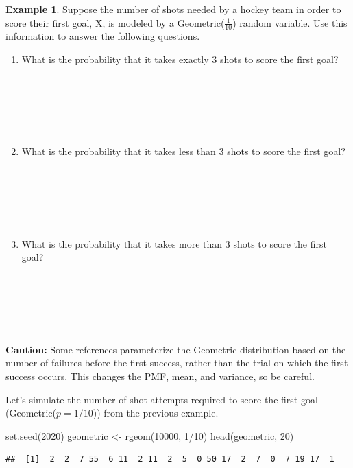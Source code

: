 \documentclass[
  11pt,
]{book}
\newenvironment{Shaded}{\begin{snugshade}}{\end{snugshade}}
\newcommand{\DecValTok}[1]{\textcolor[rgb]{0.00,0.00,0.81}{#1}}
\newcommand{\FunctionTok}[1]{\textcolor[rgb]{0.00,0.00,0.00}{#1}}
\newcommand{\NormalTok}[1]{#1}
\newcommand{\OtherTok}[1]{\textcolor[rgb]{0.56,0.35,0.01}{#1}}
\newcommand{\SpecialCharTok}[1]{\textcolor[rgb]{0.00,0.00,0.00}{#1}}
\theoremstyle{definition}
\theoremstyle{definition}
\newtheorem{example}{Example}[chapter]
\theoremstyle{definition}
\theoremstyle{definition}
\theoremstyle{remark}
\begin{document}
\begin{example}
Suppose the number of shots needed by a hockey team in order to score their first goal, X, is modeled by a Geometric(\(\frac{1}{10}\)) random variable. Use this information to answer the following questions.
\end{example}

\begin{enumerate}
\def\labelenumi{(\alph{enumi})}
\item
  What is the probability that it takes exactly 3 shots to score the first goal?\\
  \strut \\
  \strut \\
  \strut \\
\item
  What is the probability that it takes less than 3 shots to score the first goal?\\
  \strut \\
  \strut \\
  \strut \\
\item
  What is the probability that it takes more than 3 shots to score the first goal?\\
  \strut \\
  \strut \\
  \strut \\
\end{enumerate}

\textbf{Caution:} Some references parameterize the Geometric distribution based on the number of failures before the first success, rather than the trial on which the first success occurs. This changes the PMF, mean, and variance, so be careful.

Let's simulate the number of shot attempts required to score the first goal (Geometric(\(p=1/10\))) from the previous example.

\begin{Shaded}
\begin{Highlighting}[]
\FunctionTok{set.seed}\NormalTok{(}\DecValTok{2020}\NormalTok{)}
\NormalTok{geometric }\OtherTok{\textless{}{-}} \FunctionTok{rgeom}\NormalTok{(}\DecValTok{10000}\NormalTok{, }\DecValTok{1}\SpecialCharTok{/}\DecValTok{10}\NormalTok{)}
\FunctionTok{head}\NormalTok{(geometric, }\DecValTok{20}\NormalTok{)}
\end{Highlighting}
\end{Shaded}

\begin{verbatim}
##  [1]  2  2  7 55  6 11  2 11  2  5  0 50 17  2  7  0  7 19 17  1
\end{verbatim}
\end{document}
